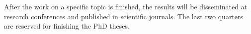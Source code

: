 \documentclass[11pt,dvipsnames,usenames,a4paper]{article}
\begin{document}
After the work on a specific topic is finished, the results will be disseminated at research conferences and published in scientific journals. 
The last two quarters are reserved for finishing the PhD theses. 

\end{document}
